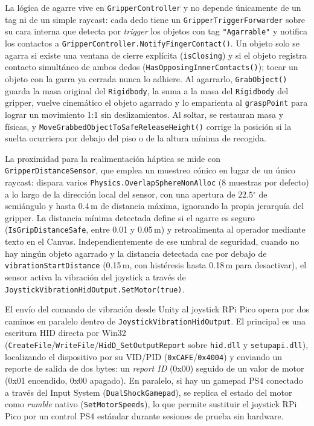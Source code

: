 La lógica de agarre vive en \texttt{GripperController} y no depende únicamente de un tag ni de un simple raycast: cada dedo tiene un \texttt{GripperTriggerForwarder} sobre su cara interna que detecta por \textit{trigger} los objetos con tag \texttt{"Agarrable"} y notifica los contactos a \texttt{GripperController.NotifyFingerContact()}. Un objeto solo se agarra si existe una ventana de cierre explícita (\texttt{isClosing}) y si el objeto registra contacto simultáneo de ambos dedos (\texttt{HasOpposingInnerContacts()}); tocar un objeto con la garra ya cerrada nunca lo adhiere. Al agarrarlo, \texttt{GrabObject()} guarda la masa original del \texttt{Rigidbody}, la suma a la masa del \texttt{Rigidbody} del gripper, vuelve cinemático el objeto agarrado y lo emparienta al \texttt{graspPoint} para lograr un movimiento 1:1 sin deslizamientos. Al soltar, se restauran masa y físicas, y \texttt{MoveGrabbedObjectToSafeReleaseHeight()} corrige la posición si la suelta ocurriera por debajo del piso o de la altura mínima de recogida.

La proximidad para la realimentación háptica se mide con \texttt{GripperDistanceSensor}, que emplea un muestreo cónico en lugar de un único raycast: dispara varios \texttt{Physics.OverlapSphereNonAlloc} (8 muestras por defecto) a lo largo de la dirección local del sensor, con una apertura de $22.5{^\circ}$ de semiángulo y hasta 0.4\,m de distancia máxima, ignorando la propia jerarquía del gripper. La distancia mínima detectada define si el agarre es seguro (\texttt{IsGripDistanceSafe}, entre 0.01 y 0.05\,m) y retroalimenta al operador mediante texto en el Canvas. Independientemente de ese umbral de seguridad, cuando no hay ningún objeto agarrado y la distancia detectada cae por debajo de \texttt{vibrationStartDistance} (0.15\,m, con histéresis hasta 0.18\,m para desactivar), el sensor activa la vibración del joystick a través de \texttt{JoystickVibrationHidOutput.SetMotor(true)}.

El envío del comando de vibración desde Unity al joystick RPi Pico opera por dos caminos en paralelo dentro de \texttt{JoystickVibrationHidOutput}. El principal es una escritura HID directa por Win32 (\texttt{CreateFile}/\texttt{WriteFile}/\texttt{HidD\_SetOutputReport} sobre \texttt{hid.dll} y \texttt{setupapi.dll}), localizando el dispositivo por su VID/PID (\texttt{0xCAFE}/\texttt{0x4004}) y enviando un reporte de salida de dos bytes: un \textit{report ID} (0x00) seguido de un valor de motor (0x01 encendido, 0x00 apagado). En paralelo, si hay un gamepad PS4 conectado a través del Input System (\texttt{DualShockGamepad}), se replica el estado del motor como \textit{rumble} nativo (\texttt{SetMotorSpeeds}), lo que permite sustituir el joystick RPi Pico por un control PS4 estándar durante sesiones de prueba sin hardware.

